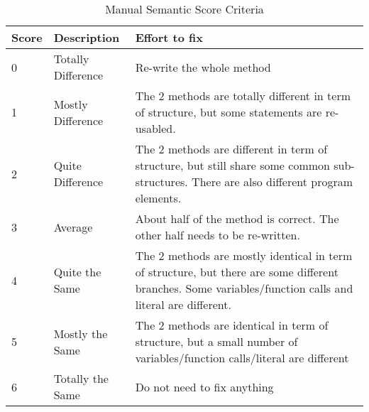 \begin{table}
\begin{tabular}{|p{0.5cm}|p{1.5cm}|p{5cm}|}
\hline
Score & Description & Effort to fix \\
\hline
0 & Totally Difference & Re-write the whole method \\
1 & Mostly Difference & The 2 methods are totally different in term of structure, but some statements are re-usabled. \\
2 & Quite Difference & The 2 methods are different in term of structure, but still share some common sub-structures. There are also different program elements. \\
3 & Average & About half of the method is correct. The other half needs to be re-written. \\
4 & Quite the Same & The 2 methods are mostly identical in term of structure, but there are some different branches. Some variables/function calls and literal are different.\\
5 & Mostly the Same & The 2 methods are identical in term of structure, but a small number of variables/function calls/literal are different \\
6 & Totally the Same & Do not need to fix anything \\
\hline
\end{tabular}
\caption{Manual Semantic Score Criteria}
\label{table:criteria}
\end{table}
